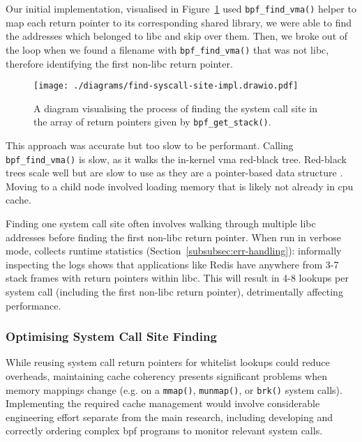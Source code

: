 Our initial implementation, visualised in Figure~\ref{fig:find-syscall-site-impl}
used \texttt{bpf\_find\_vma()} helper to map each return
pointer to its corresponding shared library, we were able to find the addresses which belonged
to \ac{libc} and skip over them. Then, we broke out of the loop when we found a
filename with \texttt{bpf\_find\_vma()} that was not \ac{libc}, therefore
identifying the first non-\ac{libc} return pointer.

\begin{figure}[htbp]
    \centering
    \texttt{[image: ./diagrams/find-syscall-site-impl.drawio.pdf]}
    \caption{A diagram visualising the process of finding the system call site
    in the array of return pointers given by \texttt{bpf\_get\_stack()}.}
    \label{fig:find-syscall-site-impl}
\end{figure}

This approach was accurate but too slow to be performant. Calling \texttt{bpf\_find\_vma()} is
slow, as it walks the in-kernel \ac{vma} red-black tree. Red-black trees scale
well but are slow to use as they are a pointer-based data structure \cite{pointer-based-ds-slow}. Moving to
a child node involved loading memory that is likely not already in \ac{cpu} cache.

Finding one system call site often involves walking through multiple \ac{libc}
addresses before finding the first non-\ac{libc} return pointer. When run in
verbose mode, \af collects runtime statistics
(Section~\ref{subsubsec:err-handling}): informally inspecting the logs shows that
applications like Redis have anywhere from 3-7 stack frames with return pointers 
within \ac{libc}. This will result in 4-8 lookups per system call (including the
first non-\ac{libc} return pointer), detrimentally affecting performance.

\subsubsection{Optimising System Call Site
Finding}\label{subsubsec:impl-find-site-opt}

While reusing system call return pointers for whitelist lookups could reduce
overheads, maintaining cache coherency presents significant problems when memory
mappings change (e.g. on a \texttt{mmap()}, \texttt{munmap()}, or \texttt{brk()}
system calls). Implementing the required cache management would involve
considerable engineering effort separate from the main research, including
developing and correctly ordering complex \ac{bpf} programs to monitor
relevant system calls. 

